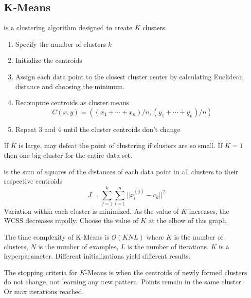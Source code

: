 \documentclass[12pt]{scrartcl}
\begin{document}
\subsection{K-Means}

\begin{definition}
   is a clustering algorithm designed to create $K$ clusters.
  \begin{enumerate}
    \item Specify the number of clusters $k$
    \item Initialize the centroids
    \item Assign each data point to the closest cluster center by calculating Euclidean distance and choosing the minimum.
    \item Recompute centroids as cluster means
    \[C(x, y) = ((x_1 + \cdots + x_n) / n, (y_1 + \cdots + y_n) / n)\]
    \item Repeat 3 and 4 until the cluster centroids don't change
  \end{enumerate}
\end{definition}

\begin{note}
  If $K$ is large, may defeat the point of clustering if clusters are so small. If $K= 1 $ then one big cluster for the entire data set.
\end{note}

\begin{note}
   is the sum of squares of the distances of each data point in all clusters to their 
  respective centroids
  \[J = \sum_{j=1}^k \sum_{i=1}^n ||x_i^{(j)} - c_k||^2\]
  Variation within each cluster is minimized. As the value of $K$ increases, 
  the WCSS decreases rapidly. Choose the value of $K$ at the elbow of this graph.
\end{note}

\begin{note}
  The time complexity of K-Means is $\mathcal{O}(KNL)$ where $K$ is the number of clusters, 
  $N$ is the number of examples, $L$ is the number of iterations. $K$ is a hyperparameter. 
  Different initializations yield different results. 
\end{note}

\begin{note}
  The stopping criteria for $K$-Means is when the centroids of newly formed 
  clusters do not change, not learning any new pattern. Points remain in the same cluster. Or max iterations reached.
\end{note}
\end{document}
